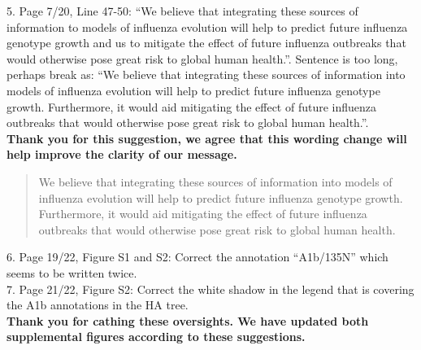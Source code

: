 \documentclass[11pt,oneside,letterpaper]{article}
\begin{document}
5. Page 7/20, Line 47-50: “We believe that integrating these sources of information to models of influenza evolution will help to predict future influenza genotype growth and us to mitigate the effect of future influenza outbreaks that would otherwise pose great risk to global human health.”. Sentence is too long, perhaps break as: “We believe that integrating these sources of information into models of influenza evolution will help to predict future influenza genotype growth. Furthermore, it would aid mitigating the effect of future influenza outbreaks that would otherwise pose great risk to global human health.”.\\

\textbf{Thank you for this suggestion, we agree that this wording change will help improve the clarity of our message.}

\begin{quotation}
  We believe that integrating these sources of information into models of influenza evolution will help to predict future influenza genotype growth.
  Furthermore, it would aid mitigating the effect of future influenza outbreaks that would otherwise pose great risk to global human health.
\end{quotation}

6. Page 19/22, Figure S1 and S2: Correct the annotation “A1b/135N” which seems to be written twice.\\

7. Page 21/22, Figure S2: Correct the white shadow in the legend that is covering the A1b annotations in the HA tree.\\

\textbf{Thank you for cathing these oversights. We have updated both supplemental figures according to these suggestions.}

\clearpage
\renewcommand{\thefigure}{S\arabic{figure}}
\end{document}
